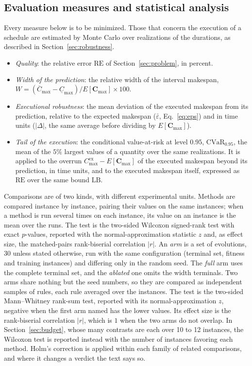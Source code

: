 \documentclass[preprint,number,sort&compress,12pt]{elsarticle}
\newcommand{\RE}{\mathrm{RE}}
\newcommand{\LB}{\mathrm{LB}}
\begin{document}
\subsection{Evaluation measures and statistical analysis}
\label{sec:stats}
Every measure below is to be minimized. Those that concern the
execution of a schedule are estimated by Monte Carlo over realizations
of the durations, as described in Section~\ref{sec:robustness}.
\begin{itemize}
\item \emph{Quality}: the relative error $\RE$ of
  Section~\ref{sec:problem}, in percent.
\item \emph{Width of the prediction}: the relative width of the interval
  makespan,
  $W = (\overline{C}_{\max}-\underline{C}_{\max})/E[\mathbf{C}_{\max}]
  \times 100$.
\item \emph{Executional robustness}: the mean deviation of the executed
  makespan from its prediction, relative to the expected makespan
  ($\bar\varepsilon$, Eq.~\eqref{eq:eps}) and in time units
  ($|\Delta|$, the same average before dividing by
  $E[\mathbf{C}_{\max}]$).
\item \emph{Tail of the execution}: the conditional value-at-risk at
  level $0.95$, $\mathrm{CVaR}_{0.95}$, the mean of the $5\%$
  largest values of a quantity over the same realizations. It is applied
  to the overrun $C^{\mathrm{ex}}_{\max}-E[\mathbf{C}_{\max}]$ of the
  executed makespan beyond its prediction, in time units, and to the
  executed makespan itself, expressed as $\RE$ over the same bound
  $\LB$.
\end{itemize}

Comparisons are of two kinds, with different experimental units.
Methods are compared instance by instance, pairing their values on the
same instances; when a method is run several times on each instance,
its value on an instance is the mean over the runs. The test is the
two-sided Wilcoxon signed-rank test with exact $p$-values, reported with
the normal-approximation statistic $z$ and, as effect size, the
matched-pairs rank-biserial correlation $|r|$. An \emph{arm} is a set of
evolutions, 30 unless stated otherwise, run with the same configuration
(terminal set, fitness and training instances) and differing only in the
random seed. The \emph{full} arm uses the complete terminal set, and the
\emph{ablated} one omits the width terminals. Two arms share nothing but
the seed numbers, so they are compared as independent samples of rules,
each rule averaged over the instances. The test is the two-sided
Mann--Whitney rank-sum test, reported with its normal-approximation $z$,
negative when the first arm named has the lower values. Its effect size
is the rank-biserial correlation $|r|$, which is $1$ when the two arms
do not overlap. In
Section~\ref{sec:budget}, whose many contrasts are each over 10 to 12
instances, the Wilcoxon test is reported instead with the number of
instances favoring each method. Holm's correction is applied within each family
of related comparisons, and where it changes a verdict the text says
so.
\end{document}
